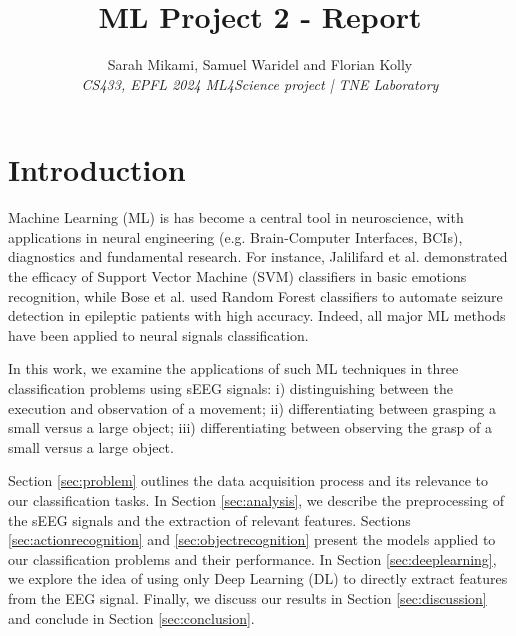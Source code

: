 \documentclass[10pt,conference,compsocconf]{IEEEtran}
\begin{document}
\title{ML Project 2 - Report}

\author{
  Sarah Mikami, Samuel Waridel and Florian Kolly \\
  \textit{CS433, EPFL 2024}
  \textit{ML4Science project | TNE Laboratory}
}

\maketitle

\begin{abstract}

\end{abstract}

\section{Introduction}
Machine Learning (ML) is has become a central tool in neuroscience, with applications in neural engineering (e.g. Brain-Computer Interfaces, BCIs), diagnostics and fundamental research. For instance, Jalilifard et al. \cite{EmotionClassificationSVM} demonstrated the efficacy of Support Vector Machine (SVM) classifiers in basic emotions recognition, while Bose et al. \cite{EEGRandomForset} used Random Forest classifiers to automate seizure detection in epileptic patients with high accuracy. Indeed, all major ML methods have been applied to neural signals classification\cite{EEGMLReview}.

In this work, we examine the applications of such ML techniques in three classification problems using sEEG signals: i) distinguishing between the execution and observation of a movement; ii) differentiating between grasping a small versus a large object; iii) differentiating between observing the grasp of a small versus a large object.

Section \ref{sec:problem} outlines the data acquisition process and its relevance to our classification tasks. In Section \ref{sec:analysis}, we describe the preprocessing of the sEEG signals and the extraction of relevant features. Sections \ref{sec:actionrecognition} and \ref{sec:objectrecognition} present the models applied to our classification problems and their performance. In Section \ref{sec:deeplearning}, we explore the idea of using only Deep Learning (DL) to directly extract features from the EEG signal. Finally, we discuss our results in Section \ref{sec:discussion} and conclude in Section \ref{sec:conclusion}.
\end{document}
